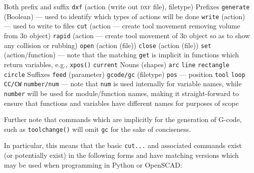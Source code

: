 \documentclass{ltxdoc}
\begin{document}
\begin{outline}
\1 Both prefix and suffix
\2 \texttt{dxf} (action (write out \textsc{dxf} file), filetype)
\1 Prefixes
\2 \texttt{generate} (Boolean) --- used to identify which types of actions will be done
\2 \texttt{write} (action) --- used to write to files
\2 \texttt{cut} (action --- create tool movement removing volume from \textsc{3d} object)
\2 \texttt{rapid} (action --- create tool movement of \textsc{3d} object so as to show any collision or rubbing)
\2 \texttt{open} (action (file))
\2 \texttt{close} (action (file))
\2 \texttt{set} (action/function) --- note that the matching \verb|get| is implicit in functions which return variables, e.g., \verb|xpos()|
\2 \texttt{current}
\1 Nouns (shapes)
\2 \texttt{arc}
\2 \texttt{line}
\2 \texttt{rectangle}
\2 \texttt{circle}
\1 Suffixes
\2 \texttt{feed} (parameter)
\2 \texttt{gcode/gc} (filetype)
\2 \texttt{pos} --- position
\2 \texttt{tool}
\2 \texttt{loop}
\2 \texttt{CC/CW}
\2 \texttt{number/num} --- note that \verb|num| is used internally for variable names, while \verb|number| will be used for module/function names, making it straight-forward to ensure that functions and variables have different names for purposes of scope
\end{outline}

\noindent Further note that commands which are implicitly for the generation of G-code, such as \verb|toolchange()| will omit \verb|gc| for the sake of conciseness.

In particular, this means that the basic \verb|cut...| and associated commands exist (or potentially exist) in the following forms and have matching versions which may be used when programming in Python or OpenSCAD:
\end{document}

